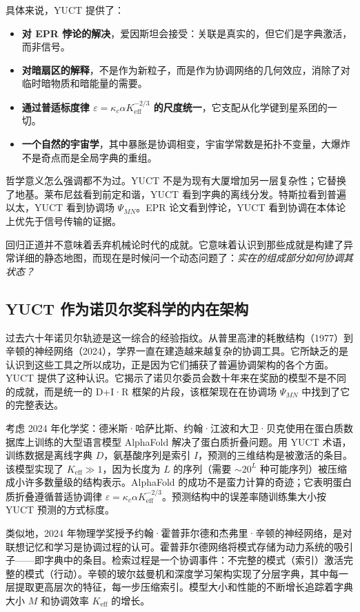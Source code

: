 \documentclass[12pt,a4paper]{article}
\begin{document}
	具体来说，YUCT 提供了：
	\begin{itemize}
		\item \textbf{对 EPR 悖论的解决}，爱因斯坦会接受：关联是真实的，但它们是字典激活，而非信号。
		\item \textbf{对暗扇区的解释}，不是作为新粒子，而是作为协调网络的几何效应，消除了对临时暗物质和暗能量的需要。
		\item \textbf{通过普适标度律 \(\varepsilon = \kappa_c \alpha K_{\mathrm{eff}}^{-2/3}\) 的尺度统一}，它支配从化学键到星系团的一切。
		\item \textbf{一个自然的宇宙学}，其中暴胀是协调相变，宇宙学常数是拓扑不变量，大爆炸不是奇点而是全局字典的重组。
	\end{itemize}
	
	哲学意义怎么强调都不为过。YUCT 不是为现有大厦增加另一层复杂性；它替换了地基。莱布尼兹看到前定和谐，YUCT 看到字典的离线分发。特斯拉看到普遍以太，YUCT 看到协调场 \(\Psi_{MN}\)。EPR 论文看到悖论，YUCT 看到协调在本体论上优先于信号传输的证据。
	
	回归正道并不意味着丢弃机械论时代的成就。它意味着认识到那些成就是构建了异常详细的静态地图，而现在是时候问一个动态问题了：\emph{实在的组成部分如何协调其状态？}
	
	\subsection{YUCT 作为诺贝尔奖科学的内在架构}
	
	过去六十年诺贝尔轨迹是这一综合的经验指纹。从普里高津的耗散结构（1977）到辛顿的神经网络（2024），学界一直在建造越来越复杂的协调工具。它所缺乏的是认识到这些工具之所以成功，正是因为它们捕获了普遍协调架构的各个方面。YUCT 提供了这种认识。它揭示了诺贝尔委员会数十年来在奖励的模型不是不同的成就，而是统一的 D+I·R 框架的片段，该框架现在在协调场 \(\Psi_{MN}\) 中找到了它的完整表达。
	
	考虑 2024 年化学奖：德米斯·哈萨比斯、约翰·江波和大卫·贝克使用在蛋白质数据库上训练的大型语言模型 AlphaFold 解决了蛋白质折叠问题。用 YUCT 术语，训练数据是离线字典 \(D\)，氨基酸序列是索引 \(I\)，预测的三维结构是被激活的条目。该模型实现了 \(K_{\mathrm{eff}} \gg 1\)，因为长度为 \(L\) 的序列（需要 \(\sim 20^L\) 种可能序列）被压缩成小许多数量级的结构表示。AlphaFold 的成功不是蛮力计算的奇迹；它表明蛋白质折叠遵循普适协调律 \(\varepsilon = \kappa_c \alpha K_{\mathrm{eff}}^{-2/3}\)。预测结构中的误差率随训练集大小按 YUCT 预测的方式标度。
	
	类似地，2024 年物理学奖授予约翰·霍普菲尔德和杰弗里·辛顿的神经网络，是对联想记忆和学习是协调过程的认可。霍普菲尔德网络将模式存储为动力系统的吸引子——即字典中的条目。检索过程是一个协调事件：不完整的模式（索引）激活完整的模式（行动）。辛顿的玻尔兹曼机和深度学习架构实现了分层字典，其中每一层提取更高层次的特征，每一步压缩索引。模型大小和性能的不断增长追踪着字典大小 \(M\) 和协调效率 \(K_{\mathrm{eff}}\) 的增长。
	
\end{document}
